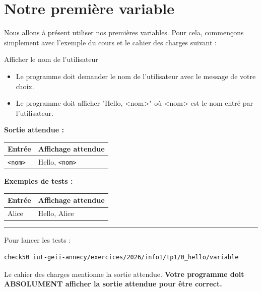 \section{Notre première variable}
Nous allons à présent utiliser nos premières variables. Pour cela, commençons simplement avec l'exemple du cours et le cahier des charges suivant :
\begin{UPSTIcahierDesCharges}{Afficher le nom de l'utilisateur}
	\begin{itemize}
		\item Le programme doit demander le nom de l'utilisateur avec le message de votre choix.
		\item Le programme doit afficher "Hello, <nom>" où <nom> est le nom entré par l'utilisateur.
	\end{itemize}
	\textbf{Sortie attendue :}
	\begin{center}
		\begin{tabular}{|l|l|}
			\hline
			Entrée         & Affichage attendue    \\
			\hline
			\texttt{<nom>} & Hello, \texttt{<nom>} \\
			\hline
		\end{tabular}
	\end{center}
	\textbf{Exemples de tests :}
	\begin{center}
		\begin{tabular}{|l|l|}
			\hline
			Entrée & Affichage attendue \\
			\hline
			Alice  & Hello, Alice       \\
			\hline
		\end{tabular}
	\end{center}
	\hrule
	Pour lancer les tests :
	\begin{lstlisting}[language=bash,style=console]
	check50 iut-geii-annecy/exercices/2026/info1/tp1/0_hello/variable
\end{lstlisting}
\end{UPSTIcahierDesCharges}

Le cahier des charges mentionne la sortie attendue. \textbf{Votre programme doit ABSOLUMENT afficher la sortie attendue pour être correct.}

